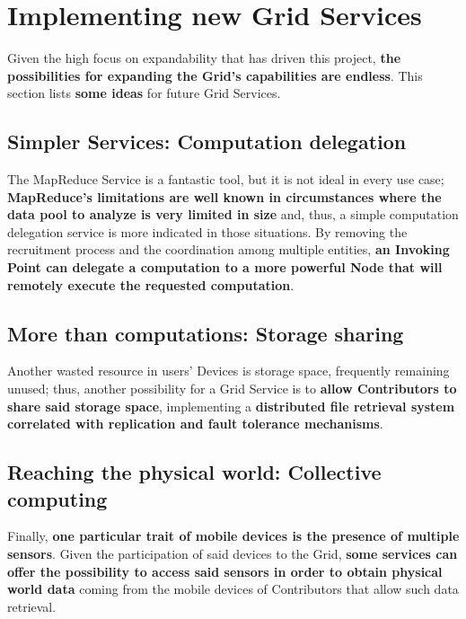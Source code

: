 \section{Implementing new Grid Services}
Given the high focus on expandability that has driven this project, \textbf{the possibilities for expanding the Grid's capabilities are endless}. This section lists \textbf{some ideas} for future Grid Services.

\subsection{Simpler Services: Computation delegation}
The MapReduce Service is a fantastic tool, but it is not ideal in every use case; \textbf{MapReduce's limitations are well known in circumstances where the data pool to analyze is very limited in size} and, thus, a simple computation delegation service is more indicated in those situations. By removing the recruitment process and the coordination among multiple entities, \textbf{an Invoking Point can delegate a computation to a more powerful Node that will remotely execute the requested computation}.

\subsection{More than computations: Storage sharing}
Another wasted resource in users' Devices is storage space, frequently remaining unused; thus, another possibility for a Grid Service is to \textbf{allow Contributors to share said storage space}, implementing a \textbf{distributed file retrieval system correlated with replication and fault tolerance mechanisms}.

\subsection{Reaching the physical world: Collective computing}
Finally, \textbf{one particular trait of mobile devices is the presence of multiple sensors}. Given the participation of said devices to the Grid, \textbf{some services can offer the possibility to access said sensors in order to obtain physical world data} coming from the mobile devices of Contributors that allow such data retrieval. 